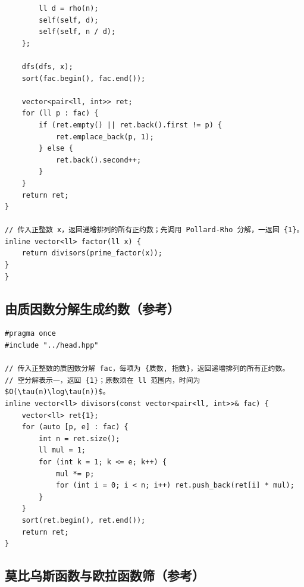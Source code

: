 \begin{lstlisting}
        ll d = rho(n);
        self(self, d);
        self(self, n / d);
    };

    dfs(dfs, x);
    sort(fac.begin(), fac.end());

    vector<pair<ll, int>> ret;
    for (ll p : fac) {
        if (ret.empty() || ret.back().first != p) {
            ret.emplace_back(p, 1);
        } else {
            ret.back().second++;
        }
    }
    return ret;
}

// 传入正整数 x，返回递增排列的所有正约数；先调用 Pollard-Rho 分解，一返回 {1}。
inline vector<ll> factor(ll x) {
    return divisors(prime_factor(x));
}
} 
\end{lstlisting}

\subsection{由质因数分解生成约数（参考）}
\par

\begin{lstlisting}
#pragma once
#include "../head.hpp"

// 传入正整数的质因数分解 fac，每项为 {质数, 指数}，返回递增排列的所有正约数。
// 空分解表示一，返回 {1}；原数须在 ll 范围内，时间为 $O(\tau(n)\log\tau(n))$。
inline vector<ll> divisors(const vector<pair<ll, int>>& fac) {
    vector<ll> ret{1};
    for (auto [p, e] : fac) {
        int n = ret.size();
        ll mul = 1;
        for (int k = 1; k <= e; k++) {
            mul *= p;
            for (int i = 0; i < n; i++) ret.push_back(ret[i] * mul);
        }
    }
    sort(ret.begin(), ret.end());
    return ret;
}
\end{lstlisting}

\subsection{莫比乌斯函数与欧拉函数筛（参考）}
\par

